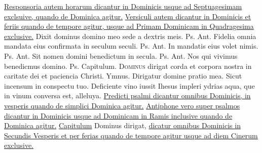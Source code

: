 \begin{multicols*}{2}
\newline \ul{Responsoria autem horarum dicantur in Dominicis usque ad Septuagesimam exclsuive, quando de Dominica agitur.}
\newline \ul{Versiculi autem dicantur in Dominicis et feriis quando de tempore agitur, usque ad Primam Dominicam in Quadragesima exclusive.}
 Dixit dominus domino meo sede a dextris meis. {\color{Red} Ps.}  {\color{Red} Ant.} Fidelia omnia mandata eius confirmata in seculum seculi. {\color{Red} Ps.}  {\color{Red} Ant.} In mandatis eius volet nimis. {\color{Red} Ps.}  {\color{Red} Ant.} Sit nomen domini benedictum in secula. {\color{Red} Ps.}  {\color{Red} Ant.} Nos qui vivimus benedicmus domino. {\color{Red} Ps.}  {\color{Red} Capitulum.}
\lettrine[lines=2]{\zallmancaps \color{Red} D}{ominus} dirigat corda et corpora nostra in caritate dei et paciencia Christi. {\color{Red} Ymnus.}
\newline \V Dirigatur domine pratio mea.
\newline \R Sicut incensum in conspectu tuo.
 Deficiente vino iussit Ihesus impleri ydrias aqua, que in vinum conversa est, alleluya.
\newline \ul{Predicti psalmi dicantur omnibus Dominicis, in vesperis quando de simplici Dominica agitur.}
\newline \ul{Antiphone vero super psalmos dicantur in Dominicis usque ad Dominicam in Ramis inclusive quando de Dominica agitur.}
\newline \ul{Capitulum} Dominus dirigat, \ul{dicatur omnibus Dominicis in Secundis Vesperis et per ferias quando de tempore agitur usque ad diem Cinerum exclusive.}

\end{multicols*}
